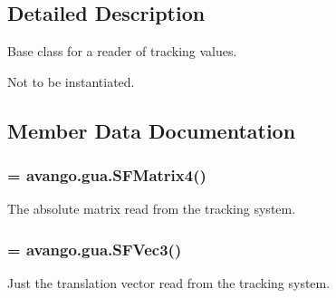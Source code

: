\subsection{\-Detailed \-Description}
\-Base class for a reader of tracking values. 

\-Not to be instantiated. 

\subsection{\-Member \-Data \-Documentation}
\hypertarget{classlib_1_1TrackingReader_1_1TrackingReader_a0b69c7b53e8e4bf20f513969c7709983}{
\subsubsection[{sf\-\_\-abs\-\_\-mat}]{ = avango.\-gua.\-S\-F\-Matrix4()}}\label{classlib_1_1TrackingReader_1_1TrackingReader_a0b69c7b53e8e4bf20f513969c7709983}


\-The absolute matrix read from the tracking system. 

\hypertarget{classlib_1_1TrackingReader_1_1TrackingReader_a8e13d83efc26c34d0bcdc0218f466bce}{
\subsubsection[{sf\-\_\-abs\-\_\-vec}]{ = avango.\-gua.\-S\-F\-Vec3()}}\label{classlib_1_1TrackingReader_1_1TrackingReader_a8e13d83efc26c34d0bcdc0218f466bce}


\-Just the translation vector read from the tracking system. 


